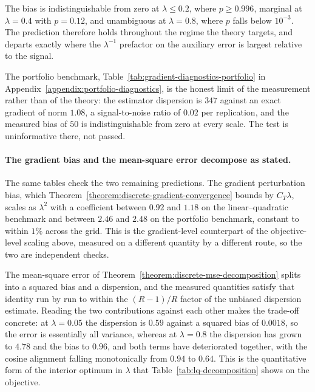 

The bias is indistinguishable from zero at $\lambda\leq0.2$, where $p\geq0.996$, marginal at $\lambda=0.4$ with $p=0.12$, and unambiguous at $\lambda=0.8$, where $p$ falls below $10^{-3}$. The prediction therefore holds throughout the regime the theory targets, and departs exactly where the $\lambda^{-1}$ prefactor on the auxiliary error is largest relative to the signal.


The portfolio benchmark, Table~\ref{tab:gradient-diagnostics-portfolio} in Appendix~\ref{appendix:portfolio-diagnostics}, is the honest limit of the measurement rather than of the theory: the estimator dispersion is $347$ against an exact gradient of norm $1.08$, a signal-to-noise ratio of $0.02$ per replication, and the measured bias of $50$ is indistinguishable from zero at every scale. The test is uninformative there, not passed.


\paragraph{The gradient bias and the mean-square error decompose as stated.}
The same tables check the two remaining predictions. The gradient perturbation bias, which Theorem~\ref{theorem:discrete-gradient-convergence} bounds by $C_T\lambda$, scales as $\lambda^2$ with a coefficient between $0.92$ and $1.18$ on the linear--quadratic benchmark and between $2.46$ and $2.48$ on the portfolio benchmark, constant to within $1\%$ across the grid. This is the gradient-level counterpart of the objective-level scaling above, measured on a different quantity by a different route, so the two are independent checks.

The mean-square error of Theorem~\ref{theorem:discrete-mse-decomposition} splits into a squared bias and a dispersion, and the measured quantities satisfy that identity run by run to within the $(R-1)/R$ factor of the unbiased dispersion estimate. Reading the two contributions against each other makes the trade-off concrete: at $\lambda=0.05$ the dispersion is $0.59$ against a squared bias of $0.0018$, so the error is essentially all variance, whereas at $\lambda=0.8$ the dispersion has grown to $4.78$ and the bias to $0.96$, and both terms have deteriorated together, with the cosine alignment falling monotonically from $0.94$ to $0.64$. This is the quantitative form of the interior optimum in $\lambda$ that Table~\ref{tab:lq-decomposition} shows on the objective.

